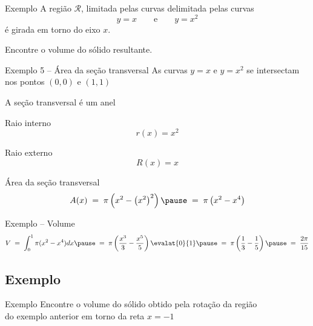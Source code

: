 \documentclass[fleqn,utf8,aspectratio=169,12pt]{beamer}
\begin{document}
\begin{frame}{Exemplo \theexemplo{}}
A região $\mathcal{R}$, limitada pelas curvas delimitada pelas curvas
\[
  y = x
  \qquad\text{e}\qquad
  y = x^2
\]
é girada em torno do eixo $x$.

\vspace{\baselineskip}
Encontre o volume do sólido resultante.
\end{frame}


\begin{frame}{Exemplo 5 -- Área da seção transversal}
As curvas $y = x$ e $y = x^2$ se intersectam nos pontos $(0, 0)$ e $(1, 1)$

\pause
\vspace{0.5\baselineskip}
A seção transversal é um anel

\pause
\vspace{0.5\baselineskip}
Raio interno
\[
  r(x) = x^2
\]

\pause
Raio externo
\[
  R(x) = x
\]

\pause
Área da seção transversal
\[
  A(x)
  \;=\; \pi \left( x^2 - \left(x^2\right)^2 \right)
  \pause
  \;=\; \pi \left( x^2 - x^4 \right)
\]
\end{frame}

\begin{frame}{Exemplo \theexemplo{} -- Volume}
  \[
    V
    \;=\; \int_0^1 \pi (x^2-x^4) dx
    \pause
    \;=\; \pi \left( \frac{x^3}{3}-\frac{x^5}{5} \right) \evalat{0}{1}
    \pause
    \;=\; \pi \left( \frac{1}{3} - \frac{1}{5} \right)
    \pause
    \;=\; \frac{2\pi}{15}
  \]
\end{frame}

\addtocounter{exemplo}{1}
\subsection{Exemplo \theexemplo}

\begin{frame}{Exemplo \theexemplo{}}
  Encontre o volume do sólido obtido pela rotação da região\\
  do exemplo anterior em torno da reta $x=-1$
\end{frame}
\end{document}
